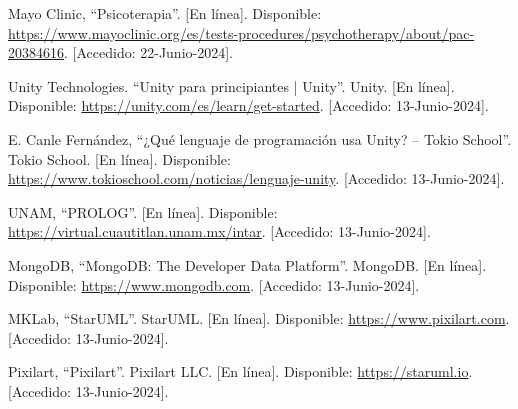 \documentclass[12pt,twoside]{article}
\begin{document}
\begin{thebibliography}{10}
	Mayo Clinic, ``Psicoterapia''. [En línea]. Disponible: \url{https://www.mayoclinic.org/es/tests-procedures/psychotherapy/about/pac-20384616}. [Accedido: 22-Junio-2024].
	
	Unity Technologies. ``Unity para principiantes | Unity''. Unity. [En línea]. Disponible: \url{https://unity.com/es/learn/get-started}. [Accedido: 13-Junio-2024].
	
	E. Canle Fernández, ``¿Qué lenguaje de programación usa Unity? – Tokio School''. Tokio School. [En línea]. Disponible: \url{https://www.tokioschool.com/noticias/lenguaje-unity}. [Accedido: 13-Junio-2024].
	
	UNAM, ``PROLOG''. [En línea]. Disponible: \url{https://virtual.cuautitlan.unam.mx/intar}. [Accedido: 13-Junio-2024].
	
	MongoDB, ``MongoDB: The Developer Data Platform''. MongoDB. [En línea]. Disponible: \url{https://www.mongodb.com}. [Accedido: 13-Junio-2024].
	
	MKLab, ``StarUML''. StarUML. [En línea]. Disponible: \url{https://www.pixilart.com}. [Accedido: 13-Junio-2024].
	
	Pixilart, ``Pixilart''. Pixilart LLC. [En línea]. Disponible: \url{https://staruml.io}. [Accedido: 13-Junio-2024].
	

	\end{thebibliography}
	
\end{document}
